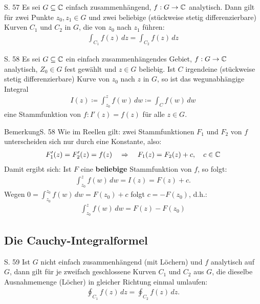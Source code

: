 \begin{satz}{S. 57}
  Es sei $G \subseteq \mathbb{C}$ einfach zusammenhängend, $f: G \to \mathbb{C}$ analytisch.
  Dann gilt für zwei Punkte $z_0, z_1 \in G$ und zwei beliebige (stückweise stetig differenzierbare) Kurven $C_1$ und $C_2$ in $G$, die von $z_0$ nach $z_1$ führen:
  \begin{align}
    \int_{C_1} f(z) \, dz = \int_{C_2} f(z) \, dz
  \end{align}
\end{satz}

\begin{satz}{S. 58}
  Es sei $G \subseteq \mathbb{C}$ ein einfach zusammenhängendes Gebiet, $f: G \to \mathbb{C}$ analytisch, $Z_0 \in G$ fest gewählt und $z \in G$ beliebig.
  Ist $C$ irgendeine (stückweise stetig differenzierbare) Kurve von $z_0$ nach $z$ in $G$, so ist das wegunabhängige Integral
  \begin{align}
    I(z) \coloneqq \int_{z_0}^z f(w) \, dw \coloneqq \int_C f(w) \, dw
  \end{align}
  eine Stammfunktion von $f: I'(z) = f(z)$ für alle $z \in G$.
\end{satz}

\begin{bemerkung}{Bemerkung}{S. 58}
  Wie im Reellen gilt: zwei Stammfunktionen $F_1$ und $F_2$ von $f$ unterscheiden sich nur durch eine Konstante, also:
  \begin{align}
    F_1'(z) = F_2'(z) = f(z)
    \quad \Rightarrow \quad
    F_1(z) = F_2(z) + c, \quad c \in \mathbb{C}
  \end{align}
  Damit ergibt sich: Ist $F$ eine \textbf{beliebige} Stammfunktion von $f$, so folgt:
  \begin{align}
    \int_{z_0}^z f(w) \, dw = I(z) = F(z) + c .
  \end{align}
  Wegen $\displaystyle 0 = \int_{z_0}^{z_0} f(w) \, dw = F(z_0) + c$ folgt $c = -F(z_0)$, d.h.:
  \begin{align}
    \int_{z_0}^z f(w) \, dw = F(z) - F(z_0)
  \end{align}
\end{bemerkung}



\subsection{Die Cauchy-Integralformel}

\begin{satz}{S. 59}
  Ist $G$ nicht einfach zusammenhängend (mit \glqq Löchern\grqq ) und $f$ analytisch auf $G$, dann gilt für je zweifach geschlossene Kurven $C_1$ und $C_2$ aus $G$, die dieselbe Ausnahmemenge (\glqq Löcher\grqq ) in gleicher Richtung einmal umlaufen:
  \begin{align}
    \oint_{C_1} f(z) \, dz = \oint_{C_2} f(z) \, dz .
  \end{align}
\end{satz}

